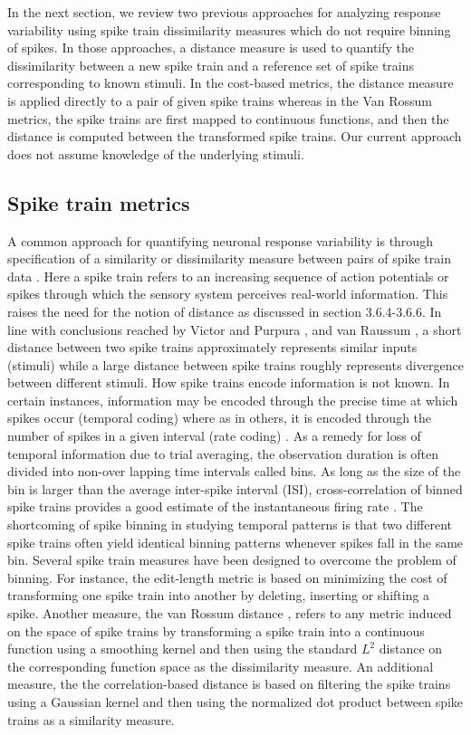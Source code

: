 
In the next section, we review two previous approaches for analyzing response variability using spike train dissimilarity measures which do not require binning
of spikes. In those approaches, a distance measure is used to quantify the dissimilarity between a new spike train and a reference set of spike trains
corresponding to known stimuli. In the cost-based metrics,
the distance measure is applied directly to a pair of given spike trains whereas in the Van Rossum metrics, the spike trains are first mapped to continuous functions, and then the distance is computed between the transformed spike trains. Our current approach does not assume knowledge of the underlying stimuli.

\subsection{Spike train metrics}
A common approach for quantifying neuronal response variability is through specification of a  similarity or dissimilarity measure between pairs of spike train data \cite{Brown2004, Victor1996, Victor1998,Rossum2001,houghton2010measuring}.
Here a spike train refers to an increasing sequence of action potentials or spikes through which the sensory system perceives real-world information.
This raises the need for the notion of distance as discussed in section 3.6.4-3.6.6.  In line with conclusions reached by Victor and Purpura \cite{Victor1996, Victor1998}, and van Raussum \cite{Rossum2001}, a short distance between two spike trains approximately represents similar inputs (stimuli) while a large distance between spike trains roughly represents divergence between different stimuli.
How spike trains encode information is not known. In certain instances, information may be encoded through the precise time at which spikes occur (temporal coding) where as in others, it is encoded through the number of spikes in a given interval (rate coding) \cite{Abbott2001}.
As a remedy for loss of temporal information due to trial averaging, the observation duration is often divided into non-over lapping time intervals called bins. As long as the size of the bin is larger than the average inter-spike interval (ISI), cross-correlation of binned spike trains provides a good estimate of the instantaneous firing rate \cite{Brown2004}. The shortcoming of spike binning in studying temporal patterns is that two different spike trains often yield identical binning patterns whenever spikes fall in the same bin. Several spike train measures have been designed to overcome the problem of binning. For instance, the edit-length metric \cite{Victor1996, Victor1998} is based on minimizing the cost of transforming one spike train into another by deleting, inserting or shifting a spike. Another measure, the van Rossum distance \cite{Rossum2001,houghton2010measuring}, refers to any metric induced on the space of spike trains by transforming a spike train into a continuous function using a smoothing kernel and then using the standard $L^2$ distance on the corresponding function space as the dissimilarity measure. An additional measure, the the correlation-based distance \cite{Schreiber2003} is based on filtering the spike trains using a Gaussian kernel and then using the normalized dot product between  spike trains as a  similarity measure.
